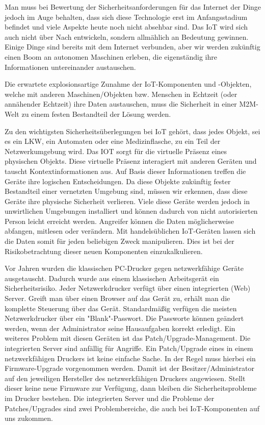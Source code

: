 Man muss bei Bewertung der Sicherheitsanforderungen für das Internet der Dinge jedoch im Auge behalten, dass sich diese Technologie erst im Anfangsstadium befindet und viele Aspekte heute noch nicht absehbar sind. Das IoT wird sich auch nicht über Nach entwickeln, sondern allmählich an Bedeutung gewinnen. Einige Dinge sind bereits mit dem Internet verbunden, aber wir werden zukünftig einen Boom an autonomen Maschinen erleben, die eigenständig ihre Informationen untereinander austauschen.

Die erwartete explosionsartige Zunahme der IoT-Komponenten und -Objekten, welche mit anderen Maschinen/Objekten bzw. Menschen in Echtzeit (oder annähender Echtzeit) ihre Daten austauschen, muss die Sicherheit in einer M2M-Welt zu einem festen Bestandteil der Lösung werden.

Zu den wichtigsten Sicherheitsüberlegungen bei IoT gehört, dass jedes Objekt, sei es ein LKW, ein Automaten oder eine Medizinflasche, zu ein Teil der Netzwerkumgebung wird. Das IOT sorgt für die virtuelle Präsenz eines physischen Objekts. Diese virtuelle Präsenz interagiert mit anderen Geräten und tauscht Kontextinformationen aus. Auf Basis dieser Informationen treffen die Geräte ihre logischen Entscheidungen. Da diese Objekte zukünftig fester Bestandteil einer vernetzten Umgebung sind, müssen wir erkennen, dass diese Geräte ihre physische Sicherheit verlieren. Viele diese Geräte werden jedoch in unwirtlichen Umgebungen installiert und können dadurch von nicht autorisierten Person leicht erreicht werden. Angreifer können die Daten möglicherweise abfangen, mitlesen oder verändern. Mit handelsüblichen IoT-Geräten lassen sich die Daten somit für jeden beliebigen Zweck manipulieren. Dies ist bei der Risikobetrachtung dieser neuen Komponenten einzukalkulieren.

Vor Jahren wurden die klassischen PC-Drucker gegen netzwerkfähige Geräte ausgetauscht. Dadurch wurde aus einem klassischen Arbeitsgerät ein Sicherheitsrisiko. Jeder Netzwerkdrucker verfügt über einen integrierten (Web) Server. Greift man über einen Browser auf das Gerät zu, erhält man die komplette Steuerung über das Gerät. Standardmäßig verfügen die meisten Netzwerkdrucker über ein "Blank"-Passwort. Die Passworte können geändert werden, wenn der Administrator seine Hausaufgaben korrekt erledigt. Ein weiteres Problem mit diesen Geräten ist das Patch/Upgrade-Management. Die integrierten Server sind anfällig für Angriffe. Ein Patch/Upgrade eines in einem netzwerkfähigen Druckers ist keine einfache Sache. In der Regel muss hierbei ein Firmware-Upgrade vorgenommen werden. Damit ist der Besitzer/Administrator auf den jeweiligen Hersteller des netzwerkfähigen Druckers angewiesen. Stellt dieser keine neue Firmware zur Verfügung, dann bleiben die Sicherheitsprobleme im Drucker bestehen. Die integrierten Server und die Probleme der Patches/Upgrades sind zwei Problembereiche, die auch bei IoT-Komponenten auf uns zukommen.

